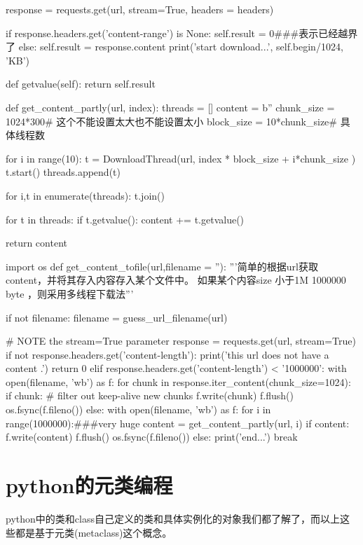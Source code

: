 \documentclass[12pt,oneside]{book}
\begin{document}
\begin{common-format}
\begin{tcbpython}[]
        response = requests.get(url, stream=True, headers = headers)

        if response.headers.get('content-range') is None:
            self.result = 0###表示已经越界了
        else:
            self.result = response.content
            print('start download...', self.begin/1024, 'KB')

    def getvalue(self):
        return self.result

def get_content_partly(url, index):
    threads = []
    content = b''
    chunk_size = 1024*300# 这个不能设置太大也不能设置太小
    block_size = 10*chunk_size# 具体线程数

    for i in range(10):
        t = DownloadThread(url, index * block_size + i*chunk_size )
        t.start()
        threads.append(t)

    for i,t in enumerate(threads):
        t.join()

    for t in threads:
        if  t.getvalue():
            content += t.getvalue()

    return content

import os
def get_content_tofile(url,filename = ''):
    '''简单的根据url获取content，并将其存入内容存入某个文件中。
    如果某个内容size 小于1M 1000000 byte ，则采用多线程下载法'''

    if not filename:
        filename = guess_url_filename(url)

    # NOTE the stream=True parameter
    response = requests.get(url, stream=True)
    if not response.headers.get('content-length'):
        print('this url does not have a content .')
        return 0
    elif response.headers.get('content-length') < '1000000':
        with open(filename, 'wb') as f:
            for chunk in response.iter_content(chunk_size=1024):
                if chunk: # filter out keep-alive new chunks
                    f.write(chunk)
                    f.flush()
                    os.fsync(f.fileno())
    else:
        with open(filename, 'wb') as f:
            for i in range(1000000):###very huge
                content = get_content_partly(url, i)
                if content:
                    f.write(content)
                    f.flush()
                    os.fsync(f.fileno())
                else:
                    print('end...')
                    break
\end{tcbpython}%





\chapter{python的元类编程}
python中的类和class自己定义的类和具体实例化的对象我们都了解了，而以上这些都是基于元类(metaclass)这个概念。


\end{common-format}
\end{document}

